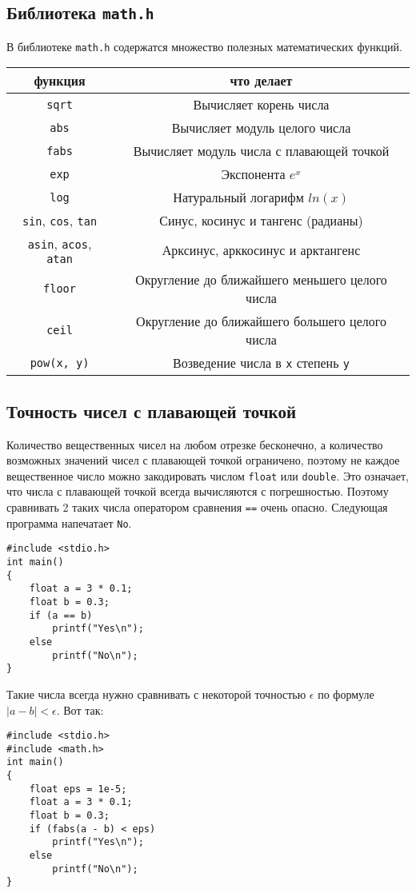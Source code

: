 \documentclass[10pt]{article}
\begin{document}
\subsection*{Библиотека \texttt{math.h}}
В библиотеке \texttt{math.h} содержатся множество полезных математических функций.

\begin{center}
\begin{tabular}{ c c }
 функция & что делает \\ \hline
 \texttt{sqrt}     & Вычисляет корень числа \\ 
 \texttt{abs}      & Вычисляет модуль целого числа \\ 
 \texttt{fabs}     & Вычисляет модуль числа с плавающей точкой \\ 
 \texttt{exp}      & Экспонента $e^x$ \\ 
 \texttt{log}      & Натуральный логарифм $ln(x)$ \\
 \texttt{sin}, \texttt{cos},  \texttt{tan} & Синус, косинус и тангенс (радианы) \\ 
 \texttt{asin}, \texttt{acos},  \texttt{atan} & Арксинус, арккосинус и арктангенс \\ 
 \texttt{floor}      & Округление до ближайшего меньшего целого числа \\
 \texttt{ceil}       & Округление до ближайшего большего целого числа \\
 \texttt{pow(x, y)}        & Возведение числа в \texttt{x} степень \texttt{y} \\
\end{tabular}
\end{center}


\subsection*{Точность чисел с плавающей точкой}
Количество вещественных чисел на любом отрезке бесконечно, а количество возможных значений чисел с плавающей точкой ограничено, поэтому не каждое вещественное число можно закодировать числом \texttt{float} или \texttt{double}. Это означает, что числа с плавающей точкой всегда вычисляются с погрешностью. Поэтому сравнивать 2 таких числа оператором сравнения \texttt{==} очень опасно. Следующая программа напечатает \texttt{No}.
\begin{lstlisting}
#include <stdio.h>
int main() 
{
    float a = 3 * 0.1;
    float b = 0.3;
    if (a == b)
        printf("Yes\n");
    else
        printf("No\n");
}
\end{lstlisting}
Такие числа всегда нужно сравнивать с некоторой точностью $\epsilon$ по формуле $|a - b| < \epsilon$. Вот так:\\ 
\begin{lstlisting}
#include <stdio.h>
#include <math.h>
int main() 
{
    float eps = 1e-5;
    float a = 3 * 0.1;
    float b = 0.3;
    if (fabs(a - b) < eps)
        printf("Yes\n");
    else
        printf("No\n");
}
\end{lstlisting}
\end{document}
